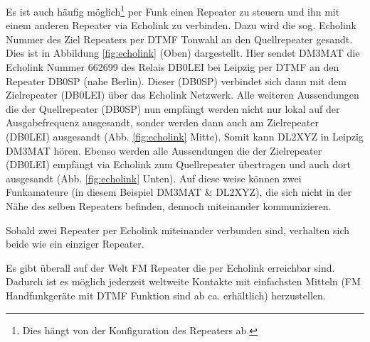 Es ist auch häufig möglich\footnote{Dies hängt von der Konfiguration des Repeaters ab.} per Funk einen Repeater zu steuern und ihn mit einem anderen Repeater via Echolink zu verbinden. Dazu wird die sog. Echolink Nummer des Ziel Repeaters per DTMF Tonwahl an den Quellrepeater gesandt. Dies ist in Abbildung \ref{fig:echolink} (Oben) dargestellt. Hier sendet DM3MAT die Echolink Nummer 662699 des Relais DB0LEI bei Leipzig per DTMF an den Repeater DB0SP (nahe Berlin). Dieser (DB0SP) verbindet sich dann mit dem Zielrepeater (DB0LEI) über das Echolink Netzwerk. Alle weiteren Aussendungen die der Quellrepeater (DB0SP) nun empfängt werden nicht nur lokal auf der Ausgabefrequenz ausgesandt, sonder werden dann auch am Zielrepeater (DB0LEI) ausgesandt (Abb. \ref{fig:echolink} Mitte). Somit kann DL2XYZ in Leipzig DM3MAT hören. Ebenso werden alle Aussendungen die der Zielrepeater (DB0LEI) empfängt via Echolink zum Quellrepeater übertragen und auch dort ausgesandt (Abb. \ref{fig:echolink} Unten).  Auf diese weise können zwei Funkamateure (in diesem Beispiel DM3MAT \& DL2XYZ), die sich nicht in der Nähe des selben Repeaters befinden, dennoch miteinander kommunizieren. 

\begin{merke}
Sobald zwei Repeater per Echolink miteinander verbunden sind, verhalten sich beide wie ein einziger Repeater. 
\end{merke}

Es gibt überall auf der Welt FM Repeater die per Echolink erreichbar sind. Dadurch ist es möglich jederzeit weltweite Kontakte mit einfachsten Mitteln (FM Handfunkgeräte mit DTMF Funktion sind ab ca.  erhältlich) herzustellen.